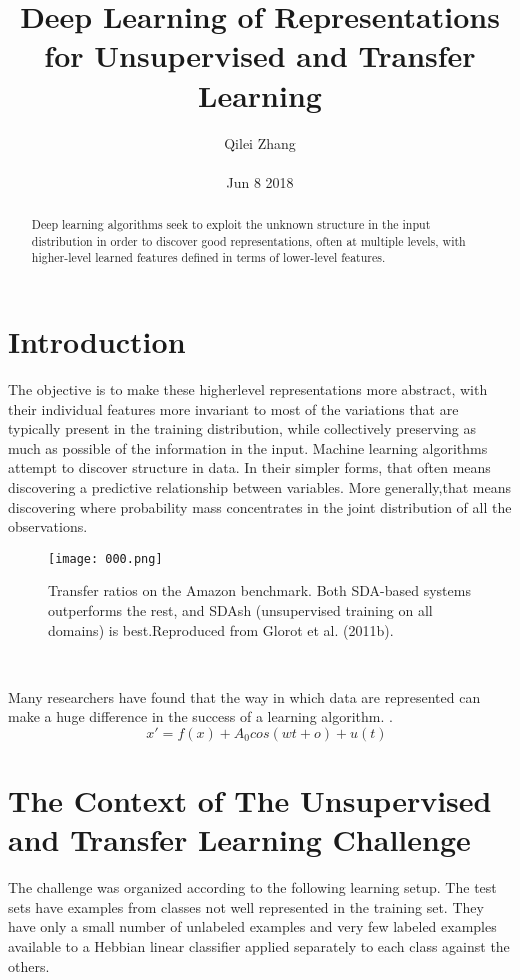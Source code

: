 \documentclass[30pt,twocolumn,letterpaper]{article}
\author{Qilei Zhang\\\\
Jun 8 2018}
\title{Deep Learning of Representations for Unsupervised and Transfer Learning}
\begin{document}
\maketitle
\begin{abstract}
  Deep learning algorithms seek to exploit the unknown structure in the input distribution in order to discover good representations, often at multiple levels, with higher-level learned features defined in terms of lower-level features.
\end{abstract}
\section{Introduction}
The objective is to make these higherlevel representations more abstract, with their individual features more invariant to most of the variations that are typically present in the training distribution, while collectively preserving as much as possible of the information in the input. Machine learning algorithms attempt to discover structure in data. In their simpler forms, that often means discovering a predictive relationship between variables. More generally,that means discovering where probability mass concentrates in the joint distribution of all the observations\cite{Baldi2014Searching}. \\
\begin{figure}[htbp]
\small
\centering
\texttt{[image: 000.png]}
\caption{Transfer ratios on the Amazon benchmark. Both SDA-based systems outperforms the rest, and SDAsh (unsupervised training on all domains) is best.Reproduced from Glorot et al. (2011b).}
\label{fig:lable}
\end{figure}\\
\par
Many researchers have found that the way in which data are represented can make a huge difference in the success of a learning algorithm. \cite{Lenz2013Deep}.
\begin{equation}
\quad x'=f(x)+A_0cos(wt+o)+u(t)
\end{equation}

\section{The Context of The Unsupervised and Transfer Learning Challenge}
The challenge was organized according to the following learning setup. The test sets have examples from classes not well represented in the training set. They have only a small number of unlabeled examples and very few labeled examples available to a Hebbian linear classifier  applied separately to each class against the others\cite{Warburton2003Deep}. \\
{\small


}
\end{document}
